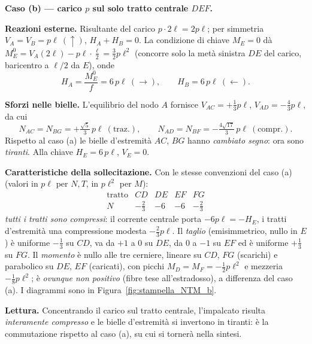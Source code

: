 \begin{esercizio}
\begin{svolgimento}
	\medskip\noindent\textbf{Caso (b) --- carico $p$ sul solo tratto centrale $DEF$.}
	\nopagebreak
	
	\medskip\noindent\textbf{Reazioni esterne.}
	Risultante del carico $p\cdot 2\ell=2p\ell$; per simmetria
	$V_A=V_B=p\ell\ (\uparrow)$, $H_A+H_B=0$. La condizione di chiave $M_E=0$ dà
	$M_E^{0}=V_A(2\ell)-p\ell\cdot\tfrac{\ell}{2}=\tfrac32 p\ell^2$ (concorre solo
	la metà sinistra $DE$ del carico, baricentro a $\ell/2$ da $E$), onde
	\[
	H_A=\frac{M_E^{0}}{f}=6\,p\ell\ (\rightarrow),\qquad H_B=6\,p\ell\ (\leftarrow).
	\]
	
	\medskip\noindent\textbf{Sforzi nelle bielle.}
	L'equilibrio del nodo $A$ fornisce $V_{AC}=+\tfrac13 p\ell$,
	$V_{AD}=-\tfrac43 p\ell$, da cui
	\[
	N_{AC}=N_{BG}=+\tfrac{\sqrt5}{3}\,p\ell\ (\text{traz.}),\qquad
	N_{AD}=N_{BF}=-\tfrac{4\sqrt{17}}{3}\,p\ell\ (\text{compr.}).
	\]
	Rispetto al caso (a) le bielle d'estremità $AC$, $BG$ hanno
	\emph{cambiato segno}: ora sono \emph{tiranti}. Alla chiave $H_E=6\,p\ell$,
	$V_E=0$.
	
	\medskip\noindent\textbf{Caratteristiche della sollecitazione.}
	Con le stesse convenzioni del caso (a) (valori in $p\ell$ per $N,T$, in
	$p\ell^2$ per $M$):
	\[
	\begin{array}{l|cccc}
		\text{tratto} & CD & DE & EF & FG\\\hline
		N & -\tfrac23 & -6 & -6 & -\tfrac23
	\end{array}
	\]
	\emph{tutti i tratti sono compressi}: il corrente centrale porta
	$-6p\ell=-H_E$, i tratti d'estremità una compressione modesta
	$-\tfrac23 p\ell$. Il \emph{taglio} (emisimmetrico, nullo in $E$) è uniforme
	$-\tfrac13$ su $CD$, va da $+1$ a $0$ su $DE$, da $0$ a $-1$ su $EF$ ed è
	uniforme $+\tfrac13$ su $FG$. Il \emph{momento} è nullo alle tre cerniere,
	lineare su $CD$, $FG$ (scarichi) e parabolico su $DE$, $EF$ (caricati), con
	picchi $M_D=M_F=-\tfrac12 p\ell^2$ e mezzeria $-\tfrac18 p\ell^2$; è
	\emph{ovunque non positivo} (fibre tese all'estradosso), a differenza del
	caso (a). I diagrammi sono in Figura~\ref{fig:stampella_NTM_b}.
	



	
%


	
	\medskip\noindent\textbf{Lettura.}
	Concentrando il carico sul tratto centrale, l'impalcato risulta
	\emph{interamente compresso} e le bielle d'estremità si invertono in
	tiranti: è la commutazione rispetto al caso (a), su cui si tornerà nella
	sintesi.


\end{svolgimento}
\end{esercizio}
